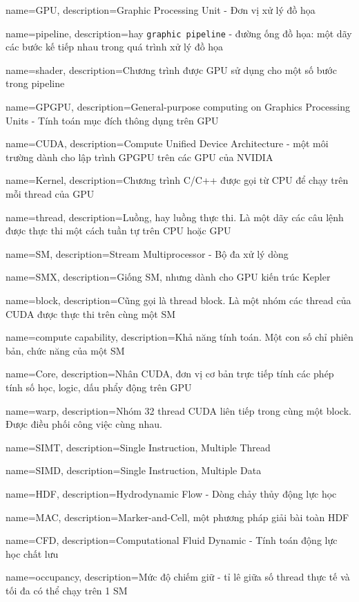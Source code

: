 {
    name=GPU,
    description={Graphic Processing Unit - Đơn vị xử lý đồ họa}
}

{
    name=pipeline,
    description={hay \texttt{graphic pipeline} - đường ống đồ họa: một dãy các bước kế tiếp nhau trong quá trình xử lý đồ họa}
}

{
    name=shader,
    description={Chương trình được GPU sử dụng cho một số bước trong pipeline}
}

{
    name=GPGPU,
    description={General-purpose computing on Graphics Processing Units - Tính
    toán mục đích thông dụng trên GPU}
}

{
    name=CUDA,
    description={Compute Unified Device Architecture - một môi trường dành cho lập trình
    GPGPU trên các GPU của NVIDIA}
}

{
    name=Kernel,
    description={Chương trình C/C++ được gọi từ CPU để chạy trên mỗi thread của GPU}
}

{
    name=thread,
    description={Luồng, hay luồng thực thi. Là một dãy các câu lệnh được thực
    thi một cách tuần tự trên CPU hoặc GPU}
}

{
    name=SM,
    description={Stream Multiprocessor - Bộ đa xử lý dòng}
}

{
    name=SMX,
    description={Giống SM, nhưng dành cho GPU kiến trúc Kepler}
}

{
    name=block,
    description={Cũng gọi là thread block. Là một nhóm các thread của CUDA được
    thực thi trên cùng một SM}
}

{
    name=compute capability,
    description={Khả năng tính toán. Một con số chỉ phiên bản, chức năng của
    một SM}
}

{
    name=Core,
    description={Nhân CUDA, đơn vị cơ bản trực tiếp tính các phép tính số học,
    logic, dấu phẩy động trên GPU}
}

{
    name=warp,
    description={Nhóm 32 thread CUDA liên tiếp trong cùng một block. Được điều
    phối công việc cùng nhau.}
}

{
    name=SIMT,
    description={Single Instruction, Multiple Thread}
}

{
    name=SIMD,
    description={Single Instruction, Multiple Data}
}

{
    name=HDF,
    description={Hydrodynamic Flow - Dòng chảy thủy động lực học}
}

{
    name=MAC,
    description={Marker-and-Cell, một phương pháp giải bài toàn HDF}
}

{
    name=CFD,
    description={Computational Fluid Dynamic - Tính toán động lực học chất lưu}
}

{
    name=occupancy,
    description={Mức độ chiếm giữ - tỉ lê giữa số thread thực tế và tối đa có
    thể chạy trên 1 SM}
}

